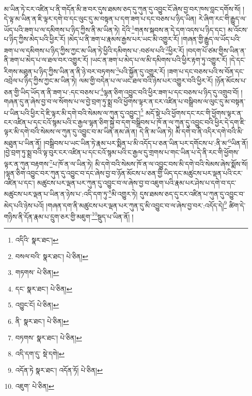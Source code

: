 མ་ཡིན་ཏེ་ངར་འཛིན་པ་ནི་གདོན་མི་ཟ་བར་དུས་ཐམས་ཅད་དུ་ཀུན་དུ་འབྱུང་ངོ་ཞེས་བྱ་བར་ཁས་བླང་དགོས་སོ། །དེ་ལྟ་མ་ཡིན་ན་ཇི་ལྟར་དགེ་བ་དང་ལུང་དུ་མ་བསྟན་པ་དག་ཟག་པ་དང་བཅས་པ་ཉིད་ཡིན། རེ་ཞིག་རང་གི་རྒྱུད་ལ་ཡོད་པའི་ཟག་པ་ལ་དམིགས་པ་ཉིད་ཀྱིས་ནི་མ་ཡིན་ཏེ། དེའི་\footnote{འདིའི་  སྣར་ཐང་། }གནས་སྐབས་ན་དེ་དག་འདས་པ་ཉིད་དང་། མ་འོངས་པ་ཉིད་ཀྱིས་མེད་པའི་ཕྱིར་རོ། །མེད་པ་ནི་ཟག་པ་རྣམས་རྒྱས་པར་ཡང་མི་འགྱུར་རོ། །གཞན་གྱི་རྒྱུད་ལ་ཡོད་པའི་ཟག་པ་ལ་དམིགས་པ་ཉིད་ཀྱིས་ཀྱང་མ་ཡིན་ཏེ་ཕྱིའི་དམིགས་པ་:བཙལ་པའི་\footnote{བསལ་བའི་  སྣར་ཐང་།  པེ་ཅིན། }ཕྱིར་རོ། །བདག་པོ་ཙམ་གྱིས་ཡིན་ན་ནི་ཟག་པ་མེད་པ་ལ་ཐལ་བར་འགྱུར་རོ། །ཡང་ན་ཟག་པ་མེད་པ་ལ་མི་དམིགས་པའི་ཕྱིར་རྟག་ཏུ་འགྱུར་རོ། །དེ་དང་རིགས་མཐུན་པ་ཉིད་ཀྱིས་ཡིན་ན་ནི་ཉེ་བར་བཏགས་\footnote{གཏགས་  པེ་ཅིན། }པའི་སྐྱོན་དུ་འགྱུར་རོ། །ཟག་པ་དང་བཅས་པའི་ས་བོན་དང་འབྲེལ་པ་ཉིད་ཀྱིས་ཀྱང་མ་ཡིན་ཏེ། ལམ་གྱི་བདེན་པ་ལ་ཡང་ཐལ་བའི་ཉེས་པར་འགྱུར་བའི་ཕྱིར་རོ། །ཉོན་མོངས་པ་ཅན་གྱི་ཡིད་ཡོད་ན་ནི་ཟག་པ་:དང་བཅས་པ་\footnote{དང་  སྣར་ཐང་།  པེ་ཅིན། }ལྷན་ཅིག་འབྱུང་བའི་ཕྱིར་ཟག་པ་དང་བཅས་པ་ཉིད་དུ་འགྲུབ་བོ། །གཞན་དུ་ན་ཞེས་བྱ་བ་ལ་སོགས་པ་ལ་བྱེ་བྲག་ཏུ་སྨྲ་བའི་ཕྱོགས་ལྟར་ན་ངར་འཛིན་པ་བསྒྲིབས་ལ་ལུང་དུ་མ་བསྟན་པ་ཡིན་པའི་ཕྱིར་དེ་ཇི་ལྟར་མི་དགེ་བའི་སེམས་ལ་ཀུན་དུ་འབྱུང་།\footnote{འབྱུང་ངོ།  པེ་ཅིན། } མདོ་སྡེ་པའི་ཕྱོགས་དང་རང་གི་ཕྱོགས་ལྟར་ན་ངར་འཛིན་པ་དང་ངའོ་སྙམ་པའི་ང་རྒྱལ་ལྷན་ཅིག་སྐྱེ་བ་དག་བསྒྲིབས་པ་ཁོ་ན་ལ་ཀུན་དུ་འབྱུང་བའི་ཕྱིར་དེ་དག་ཇི་ལྟར་མི་དགེ་བའི་སེམས་ལ་ཀུན་དུ་འབྱུང་བ་མ་ཡིན་ནམ་ཞེ་ན། དེ་ནི་མ་ཡིན་ཏེ། མི་དགེ་བ་ནི་འདིར་དགེ་བའི་མི་མཐུན་པ་ཡིན་ནོ། །བསྒྲིབས་པ་ཡང་ཡིན་ཏེ་རྣམ་པར་སྨིན་པ་མི་འདོད་པ་ཅན་ཡིན་པར་དགོངས་པ་:ནི་མ་\footnote{ནི་  སྣར་ཐང་།  པེ་ཅིན། }ཡིན་ནོ། །བྱེ་བྲག་ཏུ་སྨྲ་བའི་ལྟ་བུར་ངར་འཛིན་པ་དང་ངའོ་སྙམ་པའི་ང་རྒྱལ་དུ་གྲགས་པ་གང་ཡིན་པ་དེ་ནི་རང་གི་ཕྱོགས་ལྟར་ན་ཀུན་བརྟགས་\footnote{བཏགས་  སྣར་ཐང་།  པེ་ཅིན། }པ་ཁོ་ན་ལ་ཡིན་ཏེ། མི་དགེ་བའི་སེམས་ཁོ་ན་ལ་འབྱུང་བས་མི་དགེ་བའི་སེམས་ཞེས་སྨོས་སོ། །ལྷན་ཅིག་འབྱུང་བར་ཀུན་དུ་འབྱུང་བ་དང་ཞེས་བྱ་བ་ཉོན་མོངས་པ་ཅན་གྱི་ཡིད་དང་མཚུངས་པར་ལྡན་པའི་ངར་འཛིན་པ་དང་། མཚུངས་པར་ལྡན་པར་ཀུན་དུ་འབྱུང་བ་ལ་ཞེས་བྱ་བ་འཇུག་པའི་རྣམ་པར་ཤེས་པ་དགེ་བ་དང་མཚུངས་པར་ལྡན་པ་ཡིན་ན་ཉེས་པ་:འདི་དག་ཏུ་\footnote{འདི་དག་དུ་  སྡེ་དགེ། }མི་འགྱུར་ཏེ། དུས་ཐམས་ཅད་དུ་ངར་འཛིན་པ་ཀུན་དུ་འབྱུང་བ་མེད་པའི་ཉེས་པའོ། །གཞན་དག་ནི་མཚུངས་པར་ལྡན་པར་ཀུན་དུ་མི་འབྱུང་བ་ལ་ཞེས་བྱ་བར་:འདོད་དེ།\footnote{འདོན་ཏེ  སྣར་ཐང་། འདོན་ཏོ།  པེ་ཅིན། } ཚིག་དེ་གཉིས་ནི་དོན་རྣམ་པ་དྲུག་ཅར་གྱི་མཇུག་\footnote{འཇུག་  པེ་ཅིན། }སྡུད་པ་ཡིན་ནོ། །
